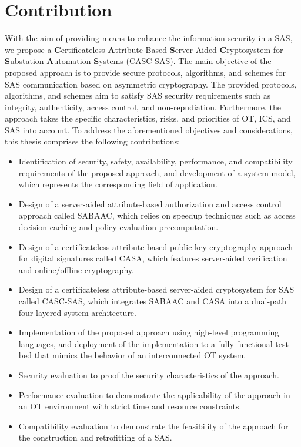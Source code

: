 \section{Contribution}
\label{sec:introduction:contribution}
With the aim of providing means to enhance the information security in a SAS, we propose a \textbf{C}ertificateless \textbf{A}ttribute-Based \textbf{S}erver-Aided \textbf{C}ryptosystem for \textbf{S}ubstation \textbf{A}utomation \textbf{S}ystems (CASC-SAS).
The main objective of the proposed approach is to provide secure protocols, algorithms, and schemes for SAS communication based on asymmetric cryptography.
The provided protocols, algorithms, and schemes aim to satisfy SAS security requirements such as integrity, authenticity, access control, and non-repudiation.
Furthermore, the approach takes the specific characteristics, risks, and priorities of OT, ICS, and SAS into account.
To address the aforementioned objectives and considerations, this thesis comprises the following contributions:
\begin{itemize}
    \item Identification of security, safety, availability, performance, and compatibility requirements of the proposed approach, and development of a system model, which represents the corresponding field of application.
    \item Design of a server-aided attribute-based authorization and access control approach called SABAAC, which relies on speedup techniques such as access decision caching and policy evaluation precomputation.
    \item Design of a certificateless attribute-based public key cryptography approach for digital signatures called CASA, which features server-aided verification and online/offline cryptography.
    \item Design of a certificateless attribute-based server-aided cryptosystem for SAS called CASC-SAS, which integrates SABAAC and CASA into a dual-path four-layered system architecture.
    \item Implementation of the proposed approach using high-level programming languages, and deployment of the implementation to a fully functional test bed that mimics the behavior of an interconnected OT system.
    \item Security evaluation to proof the security characteristics of the approach.
    \item Performance evaluation to demonstrate the applicability of the approach in an OT environment with strict time and resource constraints.
    \item Compatibility evaluation to demonstrate the feasibility of the approach for the construction and retrofitting of a SAS.
\end{itemize}
